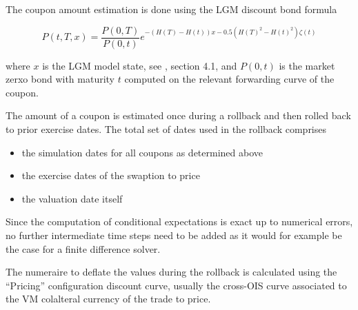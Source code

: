 The coupon amount estimation is done using the LGM discount bond formula

\begin{equation}
P(t,T,x) = \frac{P(0,T)}{P(0,t)} e^{ -(H(T)-H(t))x - 0.5 ( H(T)^2 - H(t)^2 ) \zeta(t)}
\end{equation}

where $x$ is the LGM model state, see \cite{Hagan_LGM}, section 4.1, and $P(0,t)$ is the market zerxo bond with maturity
$t$ computed on the relevant forwarding curve of the coupon.

The amount of a coupon is estimated once during a rollback and then rolled back to prior exercise dates. The total set of dates used in the rollback comprises

\begin{itemize}
\item the simulation dates for all coupons as determined above
\item the exercise dates of the swaption to price
\item the valuation date itself
\end{itemize}

Since the computation of conditional expectations is exact up to numerical errors, no further intermediate time steps
need to be added as it would for example be the case for a finite difference solver.

The numeraire to deflate the values during the rollback is calculated using the ``Pricing'' configuration discount
curve, usually the cross-OIS curve associated to the VM colalteral currency of the trade to price.

